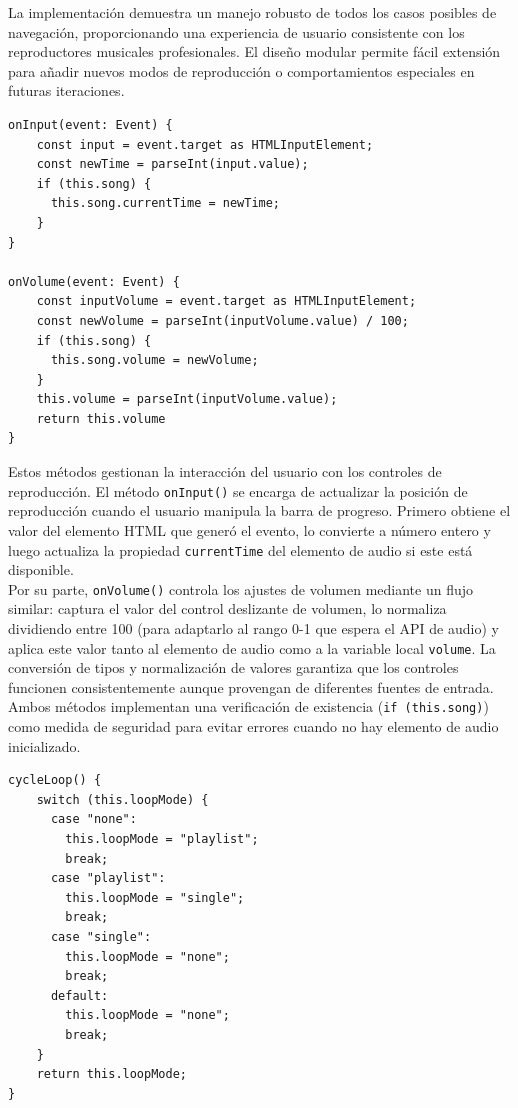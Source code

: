 \documentclass[11pt, a4paper]{article}
\begin{document}
                La implementación demuestra un manejo robusto de todos los casos posibles de navegación, proporcionando una experiencia de usuario consistente con los reproductores musicales profesionales. El diseño modular permite fácil extensión para añadir nuevos modos de reproducción o comportamientos especiales en futuras iteraciones. \\

                \begin{lstlisting}[caption={Control de tiempo y volumen}]
onInput(event: Event) {
    const input = event.target as HTMLInputElement;
    const newTime = parseInt(input.value);
    if (this.song) {
      this.song.currentTime = newTime;
    }
}

onVolume(event: Event) {
    const inputVolume = event.target as HTMLInputElement;
    const newVolume = parseInt(inputVolume.value) / 100;
    if (this.song) {
      this.song.volume = newVolume;
    }
    this.volume = parseInt(inputVolume.value);
    return this.volume
}
                \end{lstlisting}

                Estos métodos gestionan la interacción del usuario con los controles de reproducción. El método \texttt{onInput()} se encarga de actualizar la posición de reproducción cuando el usuario manipula la barra de progreso. Primero obtiene el valor del elemento HTML que generó el evento, lo convierte a número entero y luego actualiza la propiedad \texttt{currentTime} del elemento de audio si este está disponible. \\

                Por su parte, \texttt{onVolume()} controla los ajustes de volumen mediante un flujo similar: captura el valor del control deslizante de volumen, lo normaliza dividiendo entre 100 (para adaptarlo al rango 0-1 que espera el API de audio) y aplica este valor tanto al elemento de audio como a la variable local \texttt{volume}. La conversión de tipos y normalización de valores garantiza que los controles funcionen consistentemente aunque provengan de diferentes fuentes de entrada. \\

                Ambos métodos implementan una verificación de existencia (\texttt{if (this.song)}) como medida de seguridad para evitar errores cuando no hay elemento de audio inicializado.

                \begin{lstlisting}[caption={cycleLoop()}]
cycleLoop() {
    switch (this.loopMode) {
      case "none":
        this.loopMode = "playlist";
        break;
      case "playlist":
        this.loopMode = "single";
        break;
      case "single":
        this.loopMode = "none";
        break;
      default:
        this.loopMode = "none";
        break;
    }
    return this.loopMode;
}
                \end{lstlisting}
\end{document}
